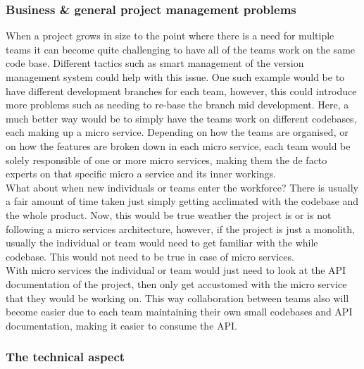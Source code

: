 \documentclass{article}
\newcommand{\vspaceconst}{-2ex}
\begin{document}
\begin{multicols}{2}
\subsubsection{Business \& general project management problems}
\vspace{\vspaceconst}

When a project grows in size to the point where there is a need for multiple teams it can become quite challenging to have all of the teams work on the same code base. Different tactics such as smart management of the version management system could help with this issue. One such example would be to have different development branches for each team, however, this could introduce more problems such as needing to re-base the branch mid development. Here, a much better way would be to simply have the teams work on different codebases, each making up a micro service. Depending on how the teams are organised, or on how the features are broken down in each micro service, each team would be solely responsible of one or more micro services, making them the de facto experts on that specific micro a service and its inner workings.\\
What about when new individuals or teams enter the workforce? There is usually a fair amount of time taken just simply getting acclimated with the codebase and the whole product. Now, this would be true weather the project is or is not following a micro services architecture, however, if the project is just a monolith, usually the individual or team would need to get familiar with the while codebase. This would not need to be true in case of micro services.\\
With micro services the individual or team would just need to look at the API documentation of the project, then only get accustomed with the micro service that they would be working on. This way collaboration between teams also will become easier due to each team maintaining their own small codebases and API documentation, making it easier to consume the API.\\

\subsubsection{The technical aspect}
\vspace{\vspaceconst}


\end{multicols}
\end{document}
